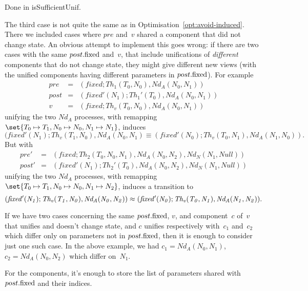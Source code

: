 \begin{impNote}
Done in isSufficientUnif. 

\end{impNote}

\begin{improve}
The third case is not quite the same as in
Optimisation~\ref{opt:avoid-induced}.  There we included cases where $pre$
and~$v$ shared a component that did not change state.  An obvious attempt to
implement this goes wrong: if there are two cases with the same $post.\fixed$
and~$v$, that include unifications of \emph{different} components that do not
change state, they might give different new views (with the unified components
having different parameters in $post.\fixed$).
%
For example
\begin{eqnarray*}
pre & = & (fixed; Th_1(T_0,N_0), Nd_A(N_0,N_1)) \\
post & = & (fixed'(N_1); Th_1'(T_0), Nd_A(N_0,N_1)) \\
v & = & (fixed; Th_v(T_0,N_0), Nd_A(N_0,N_1))
\end{eqnarray*}
unifying the two $Nd_A$ processes, with remapping $\set{T_0 \mapsto T_1, N_0
  \mapsto N_0,\linebreak[1] {N_1 \mapsto N_1}}$, induces
\[
(fixed'(N_1); Th_v(T_1,N_0), Nd_A(N_0,N_1) \equiv
(fixed'(N_0); Th_v(T_0,N_1), Nd_A(N_1,N_0)).
\]
But with 
\begin{eqnarray*}
pre' & = & (fixed; Th_2(T_0,N_0,N_1), Nd_A(N_0,N_2), Nd_N(N_1,Null)) \\
post' & = & (fixed'(N_1); Th_2'(T_0), Nd_A(N_0,N_2), Nd_N(N_1,Null))
\end{eqnarray*}
unifying the two $Nd_A$ processes, with remapping $\set{T_0 \mapsto T_1, N_0
  \mapsto N_0,\linebreak[1] {N_1 \mapsto N_2}}$, induces a transition to
\[\mit
(fixed'(N_1); Th_v(T_1,N_0), Nd_A(N_0,N_2)) \equiv
  (fixed'(N_0); Th_v(T_0,N_1), Nd_A(N_1, N_2)).
\]


If we have two cases concerning the same $post.\fixed$, $v$, and component~$c$
of~$v$ that unifies and doesn't change state, and $c$ unifies respectively
with~$c_1$ and~$c_2$ which differ only on parameters not in $post.\fixed$,
then it is enough to consider just one such case.  In the above example, we
had $c_1 = Nd_A(N_0,N_1)$,\, $c_2 = Nd_A(N_0,N_2)$ which differ on~$N_1$. 

  For the components, it's enough to store the list of
parameters shared with $post.\fixed$ and their indices. 
\end{improve}

